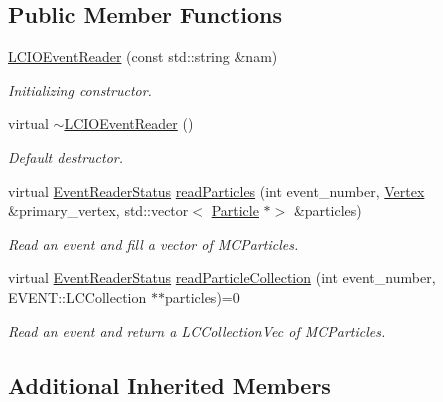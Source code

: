 \subsection*{Public Member Functions}
\begin{DoxyCompactItemize}
\item 
\hyperlink{class_d_d4hep_1_1_simulation_1_1_l_c_i_o_event_reader_a2fbe8df355a9afc3f26e3cbf85046144}{L\+C\+I\+O\+Event\+Reader} (const std\+::string \&nam)
\begin{DoxyCompactList}\small\item\em Initializing constructor. \end{DoxyCompactList}\item 
virtual \hyperlink{class_d_d4hep_1_1_simulation_1_1_l_c_i_o_event_reader_ad352960abd7fd0ff6c7e90775ba7be83}{$\sim$\+L\+C\+I\+O\+Event\+Reader} ()
\begin{DoxyCompactList}\small\item\em Default destructor. \end{DoxyCompactList}\item 
virtual \hyperlink{class_d_d4hep_1_1_simulation_1_1_geant4_event_reader_ae4f4bc83ffcf5b0c1868ad78859851e7}{Event\+Reader\+Status} \hyperlink{class_d_d4hep_1_1_simulation_1_1_l_c_i_o_event_reader_afe9e5f8fdd76cb4cd1a3a3bd85b72d75}{read\+Particles} (int event\+\_\+number, \hyperlink{class_d_d4hep_1_1_simulation_1_1_geant4_event_reader_ac9738208fe520e5aa2ad1efa13de82e7}{Vertex} \&primary\+\_\+vertex, std\+::vector$<$ \hyperlink{class_d_d4hep_1_1_simulation_1_1_geant4_event_reader_ad37f7aa722da2299517d66b4568a6a4a}{Particle} $\ast$$>$ \&particles)
\begin{DoxyCompactList}\small\item\em Read an event and fill a vector of M\+C\+Particles. \end{DoxyCompactList}\item 
virtual \hyperlink{class_d_d4hep_1_1_simulation_1_1_geant4_event_reader_ae4f4bc83ffcf5b0c1868ad78859851e7}{Event\+Reader\+Status} \hyperlink{class_d_d4hep_1_1_simulation_1_1_l_c_i_o_event_reader_a49acaafd98bbd6a954b29cfd9465d017}{read\+Particle\+Collection} (int event\+\_\+number, E\+V\+E\+N\+T\+::\+L\+C\+Collection $\ast$$\ast$particles)=0
\begin{DoxyCompactList}\small\item\em Read an event and return a L\+C\+Collection\+Vec of M\+C\+Particles. \end{DoxyCompactList}\end{DoxyCompactItemize}
\subsection*{Additional Inherited Members}


